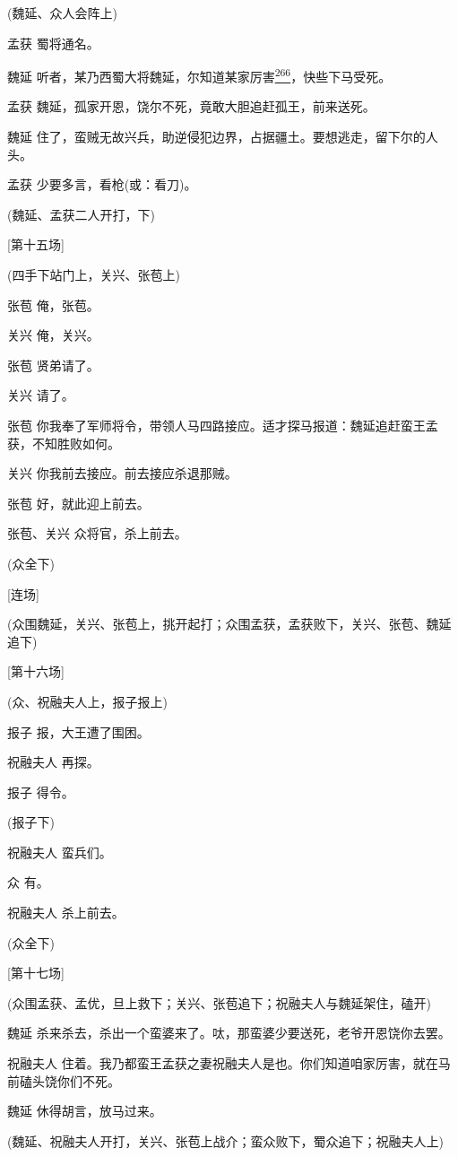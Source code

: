 (魏延、众人会阵上)

孟获 蜀将通名。

魏延
听者，某乃西蜀大将魏延，尔知道某家厉害\protect\hyperlink{fn266}{\textsuperscript{266}}，快些下马受死。

孟获 魏延，孤家开恩，饶尔不死，竟敢大胆追赶孤王，前来送死。

魏延
住了，蛮贼无故兴兵，助逆侵犯边界，占据疆土。要想逃走，留下尔的人头。

孟获 少要多言，看枪(或：看刀)。

(魏延、孟获二人开打，下)

{[}第十五场{]}

(四手下站门上，关兴、张苞上)

张苞 俺，张苞。

关兴 俺，关兴。

张苞 贤弟请了。

关兴 请了。

张苞
你我奉了军师将令，带领人马四路接应。适才探马报道：魏延追赶蛮王孟获，不知胜败如何。

关兴 你我前去接应。前去接应杀退那贼。

张苞 好，就此迎上前去。

张苞、关兴 众将官，杀上前去。

(众全下)

{[}连场{]}

(众围魏延，关兴、张苞上，挑开起打；众围孟获，孟获败下，关兴、张苞、魏延追下)

{[}第十六场{]}

(众、祝融夫人上，报子报上)

报子 报，大王遭了围困。

祝融夫人 再探。

报子 得令。

(报子下)

祝融夫人 蛮兵们。

众 有。

祝融夫人 杀上前去。

(众全下)

{[}第十七场{]}

(众围孟获、孟优，旦上救下；关兴、张苞追下；祝融夫人与魏延架住，磕开)

魏延 杀来杀去，杀出一个蛮婆来了。呔，那蛮婆少要送死，老爷开恩饶你去罢。

祝融夫人
住着。我乃都蛮王孟获之妻祝融夫人是也。你们知道咱家厉害，就在马前磕头饶你们不死。

魏延 休得胡言，放马过来。

(魏延、祝融夫人开打，关兴、张苞上战介；蛮众败下，蜀众追下；祝融夫人上)

